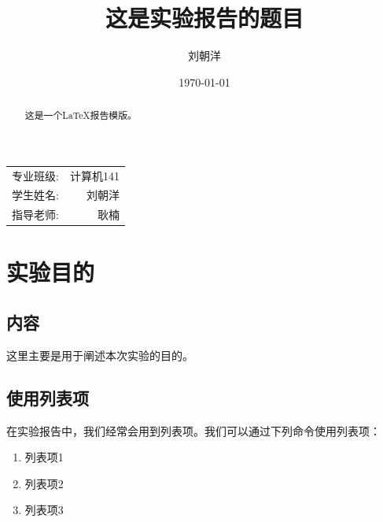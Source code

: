 \documentclass[hyperref,UTF8]{ctexart}
\title{这是实验报告的题目} %
\author{\kaishu 刘朝洋} %
\date{\today} %
\begin{document}
\maketitle %

\begin{center}
\begin{tabular}{l r}
专业班级: & 计算机141 \\ %
学生姓名: & 刘朝洋 \\ %
指导老师: & 耿楠 %
\end{tabular}
\end{center}

\begin{abstract}
这是一个\LaTeX 报告模版。
\end{abstract}

\pagestyle{plain}

\section{实验目的}

\subsection{内容}

这里主要是用于阐述本次实验的目的。

\subsection{使用列表项}

在实验报告中，我们经常会用到列表项。我们可以通过下列命令使用列表项：

\begin{enumerate}

\item 列表项1
\item 列表项2
\item 列表项3

\end{enumerate}
 
\end{document}

